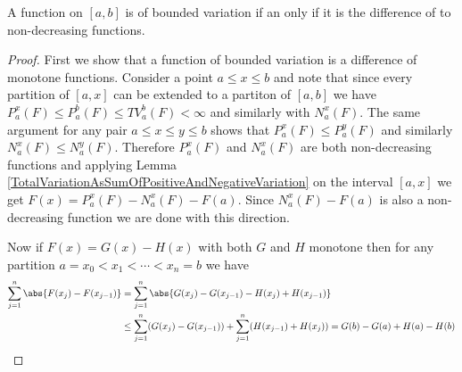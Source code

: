 \begin{thm}\label{BoundedVariationAsDifferenceOfMonotone}A function on $[a,b]$ is of bounded variation if an only if
  it is the difference of to non-decreasing functions.
\end{thm}
\begin{proof}
First we show that a function of bounded variation is a difference of
monotone functions.  Consider a point $a \leq x \leq b$ and note that since every partition
of $[a,x]$ can be extended to a partiton of $[a,b]$ we have $P_a^x(F)
\leq P_a^b(F) \leq TV_a^b(F) < \infty$ and similarly with $N_a^x(F)$.
The same argument for any pair $a \leq x \leq y \leq b$ shows that
$P_a^x(F) \leq P_a^y(F)$ and similarly $N_a^x(F) \leq N_a^y(F)$.
Therefore $P_a^x(F)$ and $N_a^x(F)$ are both non-decreasing functions
and applying Lemma
\ref{TotalVariationAsSumOfPositiveAndNegativeVariation} on the
interval $[a,x]$ we get $F(x) = P_a^x(F) - N_a^x(F) - F(a)$.  Since
$N_a^x(F) - F(a)$ is also a non-decreasing function we are done with
this direction.

Now if $F(x) = G(x) - H(x)$ with both $G$ and $H$ monotone then for
any partition $a=x_0 < x_1 < \dotsb < x_n=b$ we have
\begin{align*}
\sum_{j=1}^n \abs{F(x_j) - F(x_{j-1})} &= \sum_{j=1}^n \abs{G(x_j) -
  G(x_{j-1}) - H(x_j) + H(x_{j-1})} \\
&\leq \sum_{j=1}^n (G(x_j) -
  G(x_{j-1})) + \sum_{j=1}^n( H(x_{j-1}) + H(x_{j})) = G(b) - G(a) +
  H(a) - H(b)
\end{align*}
\end{proof}

